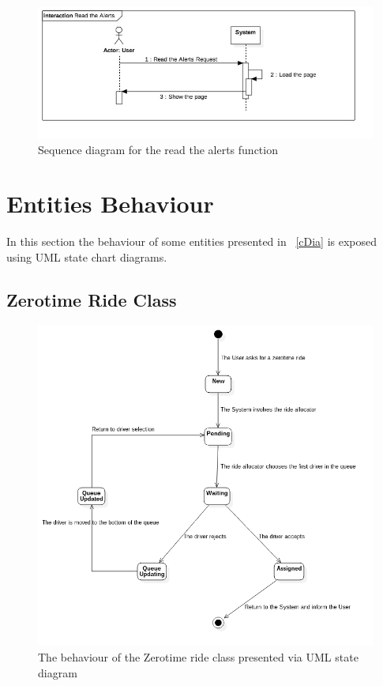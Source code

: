 \begin{figure}[h!]
	\centerline{\includegraphics[width=\paperwidth]{./figures/SD_ReadTheAlerts.jpg}}
	\caption{Sequence diagram for the read the alerts function}
\end{figure}



\clearpage

\section{Entities Behaviour}
In this section the behaviour of some entities presented in \figurename~\ref{cDia} is exposed using UML state chart diagrams.
\subsection{Zerotime Ride Class}
\begin{figure}[h!]
	\centerline{\includegraphics[width=\textwidth]{./figures/Statechart_ZerotimeRideClass.png}}
	\caption{The behaviour of the Zerotime ride class presented via UML state diagram}
\end{figure}

